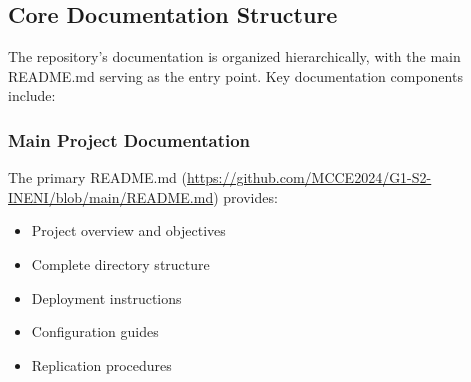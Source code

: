 \subsection{Core Documentation Structure}
The repository's documentation is organized hierarchically, with the main README.md serving as the entry point. Key documentation components include:

\subsubsection{Main Project Documentation}
The primary README.md (\url{https://github.com/MCCE2024/G1-S2-INENI/blob/main/README.md}) provides:
\begin{itemize}
    \item Project overview and objectives
    \item Complete directory structure
    \item Deployment instructions
    \item Configuration guides
    \item Replication procedures
\end{itemize}

